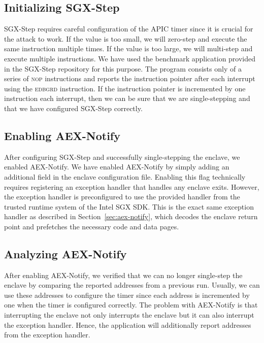 \documentclass{llncs}
\begin{document}
\subsection{Initializing SGX-Step}


SGX-Step requires careful configuration of the APIC timer
since it is crucial for the attack to work.
If the value is too small, we will zero-step and execute the same instruction multiple times.
If the value is too large, we will multi-step and execute multiple instructions.
We have used the benchmark application provided in the SGX-Step repository for this purpose.
The program consists only of a series of \textsc{nop} instructions and
reports the instruction pointer after each interrupt using the \textsc{edbgrd} instruction.
If the instruction pointer is incremented by one instruction each interrupt,
then we can be sure that we are single-stepping and
that we have configured SGX-Step correctly.

\subsection{Enabling AEX-Notify}

After configuring SGX-Step and successfully single-stepping the enclave,
we enabled AEX-Notify.
We have enabled AEX-Notify by simply adding an additional field in the enclave configuration file.
Enabling this flag technically requires registering an exception handler that handles any enclave exits.
However, the exception handler is preconfigured to use the provided handler
from the trusted runtime system of the Intel SGX SDK.
This is the exact same exception handler as described in Section~\ref{sec:aex-notify},
which decodes the enclave return point and prefetches the necessary code and data pages.

\subsection{Analyzing AEX-Notify}

After enabling AEX-Notify, we verified that we can no longer single-step the enclave
by comparing the reported addresses from a previous run.
Usually, we can use these addresses to configure the timer
since each address is incremented by one when the timer is configured correctly.
The problem with AEX-Notify is that interrupting the enclave not only
interrupts the enclave but it can also interrupt the exception handler.
Hence, the application will additionally report addresses from the exception handler.
\end{document}
